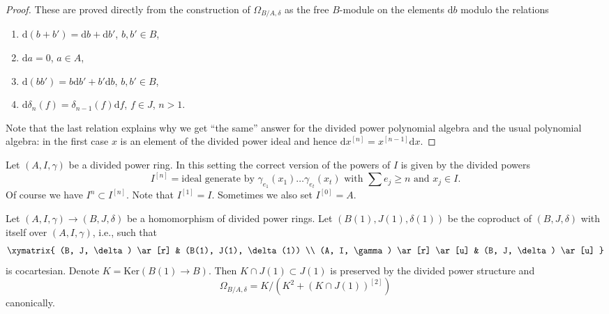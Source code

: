 \begin{proof}
These are proved directly from the construction of $\Omega_{B/A, \delta}$
as the free $B$-module on the elements $\text{d}b$ modulo the relations
\begin{enumerate}
\item $\text{d}(b + b') = \text{d}b + \text{d}b'$, $b, b' \in B$,
\item $\text{d}a = 0$, $a \in A$,
\item $\text{d}(bb') = b \text{d}b' + b' \text{d}b$, $b, b' \in B$,
\item $\text{d}\delta_n(f) = \delta_{n - 1}(f)\text{d}f$, $f \in J$, $n > 1$.
\end{enumerate}
Note that the last relation explains why we get ``the same'' answer for
the divided power polynomial algebra and the usual polynomial algebra:
in the first case $x$ is an element of the divided power ideal and hence
$\text{d}x^{[n]} = x^{[n - 1]}\text{d}x$.
\end{proof}

\noindent
Let $(A, I, \gamma)$ be a divided power ring. In this setting the
correct version of the powers of $I$ is given by the divided powers
$$
I^{[n]} = \text{ideal generate by }
\gamma_{e_1}(x_1) \ldots \gamma_{e_t}(x_t)
\text{ with }\sum e_j \geq n\text{ and }x_j \in I.
$$
Of course we have $I^n \subset I^{[n]}$. Note that $I^{[1]} = I$.
Sometimes we also set $I^{[0]} = A$.

\begin{lemma}
\label{lemma-diagonal-and-differentials}
Let $(A, I, \gamma) \to (B, J, \delta)$ be a homomorphism
of divided power rings. Let $(B(1), J(1), \delta(1))$ be the coproduct
of $(B, J, \delta)$ with itself over $(A, I, \gamma)$, i.e.,
such that
$$
\xymatrix{
(B, J, \delta) \ar[r] & (B(1), J(1), \delta(1)) \\
(A, I, \gamma) \ar[r] \ar[u] & (B, J, \delta) \ar[u]
}
$$
is cocartesian. Denote $K = \text{Ker}(B(1) \to B)$.
Then $K \cap J(1) \subset J(1)$ is preserved by the divided power
structure and
$$
\Omega_{B/A, \delta} = K/ \left(K^2 + (K \cap J(1))^{[2]}\right)
$$
canonically.
\end{lemma}

